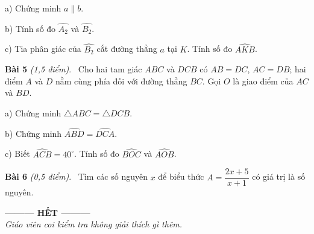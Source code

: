 \documentclass[12pt,a4paper]{article}
\newcommand{\bai}[2]{\par\medskip\textbf{Bài #1} \textit{(#2)}.~}
\newcommand{\y}[1]{\par\hspace*{0.6cm}#1}
\begin{document}
\y{a) Chứng minh $a\parallel b$.}
\y{b) Tính số đo $\widehat{A_2}$ và $\widehat{B_2}$.}
\y{c) Tia phân giác của $\widehat{B_2}$ cắt đường thẳng $a$ tại $K$. Tính số đo $\widehat{AKB}$.}
\bai{5}{1,5 điểm} Cho hai tam giác $ABC$ và $DCB$ có $AB=DC$, $AC=DB$; hai điểm $A$ và $D$ nằm cùng phía đối với đường thẳng $BC$. Gọi $O$ là giao điểm của $AC$ và $BD$.
\y{a) Chứng minh $\triangle ABC=\triangle DCB$.}
\y{b) Chứng minh $\widehat{ABD}=\widehat{DCA}$.}
\y{c) Biết $\widehat{ACB}=40^\circ$. Tính số đo $\widehat{BOC}$ và $\widehat{AOB}$.}
\bai{6}{0,5 điểm} Tìm các số nguyên $x$ để biểu thức $A=\dfrac{2x+5}{x+1}$ có giá trị là số nguyên.

\bigskip\begin{center}\textbf{--------- HẾT ---------}\\
\textit{Giáo viên coi kiểm tra không giải thích gì thêm.}\end{center}
\end{document}
